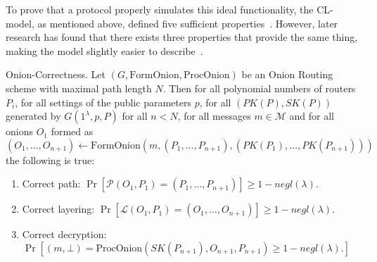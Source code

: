 To prove that a protocol properly simulates this ideal functionality,
the CL-model, as mentioned above, defined five sufficient properties~\cite{CL-model}.
However, later research has found that there exists three properties
that provide the same thing, making the model slightly easier to
describe~\cite{kuhn}.

\begin{definition}{Onion-Correctness.}
  Let \((G, \text{FormOnion}, \text{ProcOnion})\) be an Onion Routing
  scheme with maximal path length \(N\). Then for all polynomial
  numbers of routers \(P_i\), for all settings of the public
  parameters \(p\), for all \((PK(P), SK(P))\) generated by
  \(G(1^\lambda, p, P)\) for all \(n < N\), for all messages \(m \in
  \mathcal{M}\) and for all onions \(O_1\) formed as \((O_1, \ldots,
  O_{n+1}) \leftarrow
  \text{FormOnion}(m,(P_1,\ldots,P_{n+1}),(PK(P_1),\ldots,PK(P_{n+1})))\)
  the following is true:

  \begin{enumerate}
    \item{Correct path: \(\Pr[\mathcal{P}(O_1, P_1) = (P_1, \ldots,
      P_{n+1})] \geq 1 - negl(\lambda).\)}
    \item{Correct layering: \(\Pr[\mathcal{L}(O_1, P_1) = (O_1, \ldots,
        O_{n+1})] \geq 1 - negl(\lambda).\)}
    \item{Correct decryption: \(\Pr[(m,\bot) =
        \text{ProcOnion}(SK(P_{n+1}), O_{n+1}, P_{n+1}) \geq 1 -
        negl(\lambda). ]\)}
  \end{enumerate}
\end{definition}

